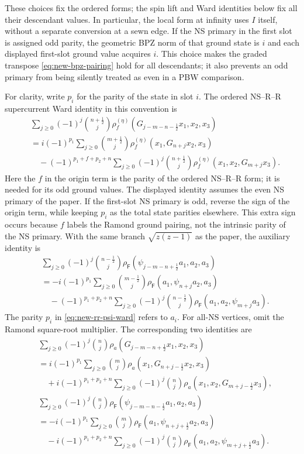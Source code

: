 These choices fix the ordered forms; the spin lift and Ward
identities below fix all their descendant values.  In particular,
the local form at infinity uses $I$ itself, without a separate
conversion at a sewn edge.
If the NS primary in the first slot is assigned odd parity, the
geometric BPZ norm of that ground state is $i$ and each displayed
first-slot ground value acquires $i$.  This choice makes the
graded transpose \eqref{eq:new-bpz-pairing} hold for all descendants;
it also prevents an odd primary from being silently treated as even
in a PBW comparison.

For clarity, write $p_i$ for the parity of the state in slot $i$.
The ordered NS--R--R supercurrent Ward identity in this convention is
\begin{align}
 &\sum_{j\ge0}(-1)^j\binom{n+\frac12}{j}
 \rho_f^{(\eta)}(G_{j-m-n-\frac12}x_1,x_2,x_3)\nonumber\\
 &=i(-1)^{p_1}\sum_{j\ge0}\binom{m+\frac12}{j}
 \rho_f^{(\eta)}(x_1,G_{n+j}x_2,x_3)\nonumber\\
 &\quad-(-1)^{p_1+f+p_2+n}\sum_{j\ge0}(-1)^j
 \binom{n+\frac12}{j}
 \rho_f^{(\eta)}(x_1,x_2,G_{m+j}x_3).
 \label{eq:new-rr-g-ward}
\end{align}
Here the $f$ in the origin term is the parity of the ordered
NS--R--R form; it is needed for its odd ground values.  The displayed
identity assumes the even NS primary of the paper.  If the first-slot
NS primary is odd, reverse the sign of the origin term, while keeping
$p_i$ as the total state parities elsewhere.  This extra sign occurs
because $f$ labels the Ramond ground pairing, not the intrinsic parity
of the NS primary.  With the same
branch $\sqrt{z(z-1)}$ as the paper, the auxiliary identity is
\begin{align}
 &\sum_{j\ge0}(-1)^j\binom{n-\frac12}{j}
 \rho_{\mathsf F}(\psi_{j-m-n+\frac12}a_1,a_2,a_3)\nonumber\\
 &=-i(-1)^{p_1}\sum_{j\ge0}\binom{m-\frac12}{j}
 \rho_{\mathsf F}(a_1,\psi_{n+j}a_2,a_3)\nonumber\\
 &\quad-(-1)^{p_1+p_2+n}\sum_{j\ge0}(-1)^j
 \binom{n-\frac12}{j}
 \rho_{\mathsf F}(a_1,a_2,\psi_{m+j}a_3).
 \label{eq:new-rr-psi-ward}
\end{align}
The parity $p_i$ in \eqref{eq:new-rr-psi-ward} refers to $a_i$.
For all-NS vertices, omit the Ramond square-root multiplier.  The
corresponding two identities are
\begin{align}
 &\sum_{j\ge0}(-1)^j\binom nj
 \rho_a(G_{j-m-n+\frac12}x_1,x_2,x_3)\nonumber\\
 &=i(-1)^{p_1}\sum_{j\ge0}\binom mj
 \rho_a(x_1,G_{n+j-\frac12}x_2,x_3)\nonumber\\
 &\quad+i(-1)^{p_1+p_2+n}\sum_{j\ge0}(-1)^j\binom nj
 \rho_a(x_1,x_2,G_{m+j-\frac12}x_3),
 \label{eq:new-ns-g-ward}\\
 &\sum_{j\ge0}(-1)^j\binom nj
 \rho_{\mathsf F}(\psi_{j-m-n-\frac12}a_1,a_2,a_3)\nonumber\\
 &=-i(-1)^{p_1}\sum_{j\ge0}\binom mj
 \rho_{\mathsf F}(a_1,\psi_{n+j+\frac12}a_2,a_3)\nonumber\\
 &\quad-i(-1)^{p_1+p_2+n}\sum_{j\ge0}(-1)^j\binom nj
 \rho_{\mathsf F}(a_1,a_2,\psi_{m+j+\frac12}a_3).
 \label{eq:new-ns-psi-ward}
\end{align}

